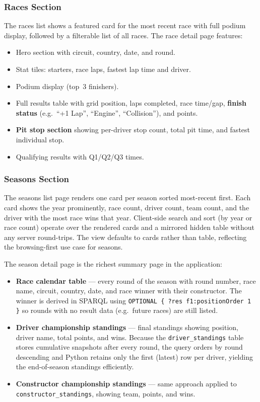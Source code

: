 \documentclass[12pt,a4paper]{article}
\begin{document}
\subsubsection{Races Section}

The races list shows a featured card for the most recent race with full podium
display, followed by a filterable list of all races. The race detail page
features:
\begin{itemize}[leftmargin=1.5em]
  \item Hero section with circuit, country, date, and round.
  \item Stat tiles: starters, race laps, fastest lap time and driver.
  \item Podium display (top~3 finishers).
  \item Full results table with grid position, laps completed, race time/gap,
        \textbf{finish status} (e.g.\ ``+1 Lap'', ``Engine'', ``Collision''), and points.
  \item \textbf{Pit stop section} showing per-driver stop count, total pit time,
        and fastest individual stop.
  \item Qualifying results with Q1/Q2/Q3 times.
\end{itemize}

\subsubsection{Seasons Section}

The seasons list page renders one card per season sorted most-recent first.
Each card shows the year prominently, race count, driver count, team count, and
the driver with the most race wins that year. Client-side search and sort
(by year or race count) operate over the rendered cards and a mirrored hidden
table without any server round-trips. The view defaults to cards rather than
table, reflecting the browsing-first use case for seasons.

The season detail page is the richest summary page in the application:

\begin{itemize}[leftmargin=1.5em]
  \item \textbf{Race calendar table} --- every round of the season with round
        number, race name, circuit, country, date, and race winner with their
        constructor. The winner is derived in SPARQL using
        \texttt{OPTIONAL \{ ?res f1:positionOrder 1 \}} so rounds with no
        result data (e.g.\ future races) are still listed.
  \item \textbf{Driver championship standings} --- final standings showing
        position, driver name, total points, and wins. Because the
        \texttt{driver\_standings} table stores cumulative snapshots after
        every round, the query orders by round descending and Python retains
        only the first (latest) row per driver, yielding the end-of-season
        standings efficiently.
  \item \textbf{Constructor championship standings} --- same approach applied
        to \texttt{constructor\_standings}, showing team, points, and wins.
\end{itemize}
\end{document}
